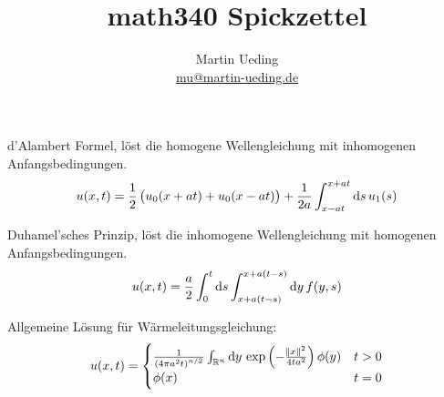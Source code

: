 


\title{math340 Spickzettel}
\author{
	Martin Ueding \\
	\small{\href{mailto:mu@martin-ueding.de}{mu@martin-ueding.de}}
}



\maketitle

d'Alambert Formel, löst die homogene Wellengleichung mit inhomogenen Anfangsbedingungen.
\[
	u(x, t) = \half \del{
		u_0(x + at)
		+ u_0(x - at)
	}
	+ \frac{1}{2a} \int_{x-at}^{x+at} \dif s \, u_1(s)
\]

Duhamel'sches Prinzip, löst die inhomogene Wellengleichung mit homogenen Anfangsbedingungen.
\[
	u(x, t) = \frac a2
	\int_0^t \dif s
	\int_{x+a(t-s)}^{x+a(t-s)} \dif y \, f(y, s)
\]

Allgemeine Lösung für Wärmeleitungsgleichung:
\[
	u(x, t) = \begin{cases}
		\frac{1}{\del{4 \pi a^2 t}^{n/2}} \int_{\R^n} \dif y \, \exp\del{- \frac{\norm x^2}{4 ta^2}} \phi(y) & t > 0 \\
		\phi(x) & t = 0
	\end{cases}
\]

%	
%	




